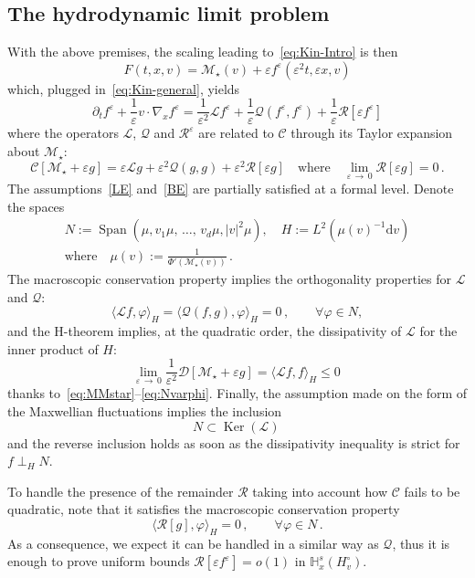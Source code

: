 \documentclass[10pt]{amsart}
\theoremstyle{definition}\newtheorem{defi}[theo]{Definition}\newtheorem{rema}[theo]{Remark}\newtheorem{exam}[theo]{Example}\newtheorem{exem}[theo]{Example}\newtheorem{nota}[theo]{Notation}
\DeclareMathOperator{\Span}{Span}
\DeclareMathOperator{\nul}{Ker}
\renewcommand{\d}{\mathrm{d}}
\newcommand{\bbH}{\mathbb{H}}
\newcommand{\CC}{\mathcal{C}}
\newcommand{\DD}{\mathcal{D}}
\newcommand{\LL}{\mathcal{L}}
\newcommand{\MM}{\mathcal{M}}
\newcommand{\QQ}{\mathcal{Q}}
\newcommand{\RR}{\mathcal{R}}
\renewcommand*\le{\leqslant}
\newcommand*\eps{{\varepsilon}}
\newcommand{\la}{\langle}
\newcommand{\ra}{\rangle}
\let\oldforall\forall
\renewcommand*{\forall}{\mathrel{\oldforall}}
\begin{document}
\subsection*{The hydrodynamic limit problem}

With the above premises, the scaling leading to~\eqref{eq:Kin-Intro} is then
\[
F(t, x, v) = \MM_\star(v) + \eps f^\eps\left(\eps^2 t, \eps x, v\right)
\]
which, plugged in~\eqref{eq:Kin-general}, yields
\[
\partial_t f^\eps + \frac{1}{\eps} v \cdot \nabla_x f^\eps = \frac{1}{\eps^2} \LL f^\eps + \frac{1}{\eps} \QQ\left(f^\eps, f^\eps\right) + \frac{1}{\eps} \RR\left[\eps f^\eps\right]
\]
where the operators $\LL$, $\QQ$ and $\RR^\eps$ are related to $\CC$ through its Taylor expansion about $\MM_\star$:
\[
\CC\left[\MM_\star + \eps g \right] = \eps \LL g + \eps^2 \QQ(g, g) + \eps^2 \RR[\eps g]\quad \text{where} \quad \lim\limits_{\eps\,\to\,0} \RR[\eps g] = 0 \,.
\]
The assumptions~\eqref{LE} and~\eqref{BE} are partially satisfied at a formal level. Denote the spaces
\begin{multline*}
N := \Span\left(\mu, v_1 \mu,\,\dots,\,v_d \mu, |v|^2 \mu\right), \quad H := L^2\left(\mu(v)^{-1} \d v\right)\\
\text{where} \quad \mu(v) := \frac{1}{\Phi'(\MM_\star(v))} \,.
\end{multline*}
The macroscopic conservation property implies the orthogonality properties for $\LL$ and $\QQ$:
\begin{equation}\label{eq:Nvarphi}
\la \LL f, \varphi \ra_H = \la \QQ(f, g), \varphi \ra_H = 0 \,, \qquad \forall \varphi \in N,
\end{equation}
and the H-theorem implies, at the quadratic order, the dissipativity of $\LL$ for the inner product of $H$:
\[
\lim_{\eps\,\to\,0}\frac{1}{\eps^{2}} \DD[\MM_{\star}+\eps g] = \la \LL f, f \ra_H \le 0 \,
\]
thanks to~\eqref{eq:MMstar}--\eqref{eq:Nvarphi}. Finally, the assumption made on the form of the Maxwellian fluctuations implies the inclusion
\[
N \subset \nul(\LL) \,
\]
and the reverse inclusion holds as soon as the dissipativity inequality is strict for $f \perp_H N$.

To handle the presence of the remainder $\RR$ taking into account how $\CC$ fails to be quadratic, note that it satisfies the macroscopic conservation property
\[
\la \RR[g], \varphi \ra_H = 0 \,, \qquad \forall \varphi \in N \,.
\]
As a consequence, we expect it can be handled in a similar way as $\QQ$, thus it is enough to prove uniform bounds $ \RR [\eps f^\eps] = o(1)$ in $\bbH^s_x(H^{\circ}_v)$.
\end{document}
